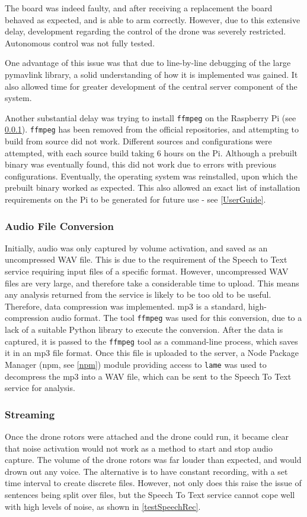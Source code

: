 \documentclass{article}
\begin{document}
The board was indeed faulty, and after receiving a replacement the board behaved as expected, and is able to arm correctly. However, due to this extensive delay, development regarding the control of the drone was severely restricted. Autonomous control was not fully tested.

One advantage of this issue was that due to line-by-line debugging of the large pymavlink library, a solid understanding of how it is implemented was gained. It also allowed time for greater development of the central server component of the system.

Another substantial delay was trying to install \texttt{ffmpeg} on the Raspberry Pi (see \ref{AudioFile}). \texttt{ffmpeg} has been removed from the official repositories, and attempting to build from source did not work. Different sources and configurations were attempted, with each source build taking 6 hours on the Pi. Although a prebuilt binary was eventually found, this did not work due to errors with previous configurations. Eventually, the operating system was reinstalled, upon which the prebuilt binary worked as expected. This also allowed an exact list of installation requirements on the Pi to be generated for future use - see \ref{UserGuide}. 

\subsubsection{Audio File Conversion}\label{AudioFile}
Initially, audio was only captured by volume activation, and saved as an uncompressed WAV file. This is due to the requirement of the Speech to Text service requiring input files of a specific format. However, uncompressed WAV files are very large, and therefore take a considerable time to upload. This means any analysis returned from the service is likely to be too old to be useful. Therefore, data compression was implemented. mp3 is a standard, high-compression audio format. The tool \texttt{ffmpeg} was used for this conversion, due to a lack of a suitable Python library to execute the conversion. After the data is captured, it is passed to the \texttt{ffmpeg} tool as a command-line process, which saves it in an mp3 file format. Once this file is uploaded to the server, a Node Package Manager (npm, see \ref{npm}) module\cite{npmlame} providing access to \texttt{lame} was used to decompress the mp3 into a WAV file, which can be sent to the Speech To Text service for analysis. 

\subsubsection{Streaming}\label{Streaming}
Once the drone rotors were attached and the drone could run, it became clear that noise activation would not work as a method to start and stop audio capture. The volume of the drone rotors was far louder than expected, and would drown out any voice. The alternative is to have constant recording, with a set time interval to create discrete files. However, not only does this raise the issue of sentences being split over files, but the Speech To Text service cannot cope well with high levels of noise, as shown in \ref{testSpeechRec}. 
\end{document}
